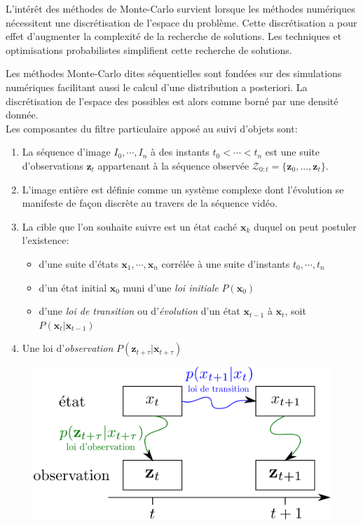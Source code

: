 \documentclass[a4paper,11pt]{report}
\begin{document}
L'intérêt des méthodes de Monte-Carlo survient lorsque les méthodes numériques nécessitent une discrétisation de l'espace du problème. Cette discrétisation a pour effet d'augmenter la complexité de la recherche de solutions. Les techniques et optimisations probabilistes simplifient cette recherche de solutions.

Les méthodes Monte-Carlo dites séquentielles sont fondées sur des simulations numériques facilitant aussi le calcul d'une distribution a posteriori. La discrétisation de l'espace des possibles est alors comme borné par une densité donnée.\\

Les composantes du filtre particulaire apposé au suivi d'objets sont:
\begin{enumerate}
\item La séquence d'image $I_0,\cdots,I_n$ à des instants $t_0<\cdots<t_n$ est une suite d'observations $\mathbf{z}_t$ appartenant à la séquence observée $ \mathcal{Z}_{0:t}=\{\mathbf{z}_0,...,\mathbf{z}_t\}$.
\item[] L'image entière est définie comme un système complexe dont l'évolution se manifeste de façon discrète au travers de la séquence vidéo.
\item La cible que l'on souhaite suivre est un état caché $\mathbf{x}_k$ duquel on peut postuler l'existence:
	\begin{itemize}
	\item d'une suite d'états $\mathbf{x}_1,\cdots,\mathbf{x}_n$ corrélée à une suite d'instants $t_0,\cdots,t_n$ 
	\item d'un état initial $\mathbf{x}_0$ muni d'une \textit{loi initiale}  $P(\mathbf{x}_0)$
	\item d'une \textit{loi de transition} ou d'\textit{évolution} d'un état $\mathbf{x}_{t-1}$ à $\mathbf{x}_{t}$, soit $P(\mathbf{x}_t|\mathbf{x}_{t-1})$
\end{itemize}
\item Une loi d'\textit{observation} $P(\mathbf{z}_{t+\tau}|\mathbf{x}_{t+\tau})$\\
\end{enumerate}

\begin{figure}[H]
\centering
\includegraphics[scale=0.5]{figureCondensationLois.png}
\end{figure}
\end{document}
